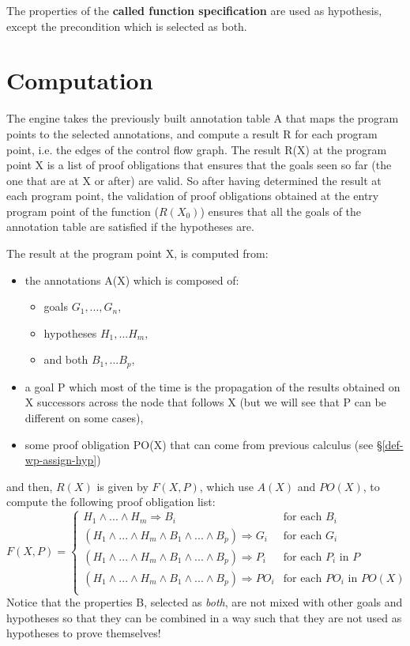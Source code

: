 The properties of the {\bf called function specification}
are used as hypothesis,
except the precondition which is selected as both.

\section{Computation}

The engine takes the previously built
annotation table A that maps the program points to the selected annotations,
and compute a result R for each program point, i.e. the edges of the control 
flow graph.
The result R(X) at the program point X is a list of proof obligations
that ensures that the goals seen so far (the one that are at X or after)
are valid.
So after having determined the result at each program point,
the validation of proof obligations obtained at the entry program point 
of the function (\(R(X_0)\))
ensures that all the goals of the annotation table are satisfied if
the hypotheses are.

The result at the program point X, is computed from:
\begin{itemize}
  \item the annotations A(X) which is composed of:
    \begin{itemize}
      \item goals \(G_1, ..., G_n\),
      \item hypotheses \(H_1, ... H_m\),
      \item and both \(B_1, ... B_p\),
    \end{itemize}
  \item a goal P which most of the time is the propagation of the results 
    obtained on X successors across the node that follows X
    (but we will see that P can be different on some cases),
  \item some proof obligation PO(X) that can come from previous calculus
    (see \S\ref{def-wp-assign-hyp})
\end{itemize}
and then, \(R(X)\) is given by \(F(X, P)\), which use \(A(X)\) and \(PO(X)\),
to compute the following proof obligation list:
\[ 
F(X, P) =
\left\{\begin{array}{ll}
 H_1 \wedge ... \wedge H_m \Rightarrow  B_i & \textrm{for each } B_i\\
(H_1 \wedge ... \wedge H_m \wedge B_1 \wedge ... \wedge B_p) \Rightarrow G_i 
                                         & \textrm{for each } G_i\\
(H_1 \wedge ... \wedge H_m \wedge B_1 \wedge ... \wedge B_p) \Rightarrow P_i 
                                    & \textrm{for each } P_i \textrm{ in } P\\
(H_1 \wedge ... \wedge H_m \wedge B_1 \wedge ... \wedge B_p) \Rightarrow PO_i
                               & \textrm{for each } PO_i \textrm{ in } PO(X)\\
\end{array}
\right.
\]
Notice that the properties B, selected as {\it both}, are not mixed
with other goals and hypotheses so that they can be
combined in a way 
such that they are not used as hypotheses to prove themselves!\\


